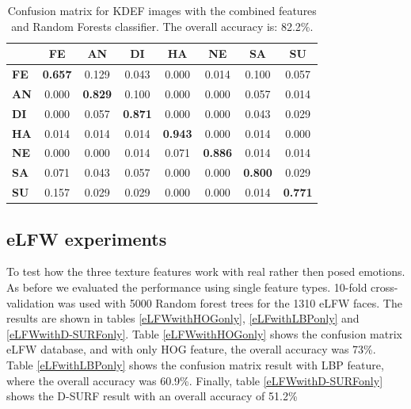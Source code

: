 \begin{table}[H]
	\fontsize{12}{12}
	\centering
	
	\caption{Confusion matrix for KDEF images with the combined features and Random Forests classifier. The overall accuracy is:  82.2\%. }
	\label{table:RF_KDEF_compined}
	\begin{tabular}{@{}|l|c|c|c|c|c|c|c|@{}}
		\hline
		& \textbf{FE}     & \textbf{AN}    & \textbf{DI}     & \textbf{HA} & \textbf{NE} & \textbf{SA}    & \textbf{SU}            \\ \hline
		\textbf{FE} & \textbf{0.657} & 0.129          & 0.043           & 0.000           & 0.014           & 0.100          & 0.057           \\ \hline
		\textbf{AN} & 0.000          & \textbf{0.829} & 0.100           & 0.000           & 0.000           & 0.057          & 0.014           \\ \hline
		\textbf{DI} & 0.000          & 0.057          & \textbf{0.871}  & 0.000           & 0.000           & 0.043          & 0.029           \\ \hline
		\textbf{HA} & 0.014          & 0.014          & 0.014           & \textbf{0.943}  & 0.000           & 0.014          & 0.000          \\ \hline
		\textbf{NE} & 0.000          & 0.000           & 0.014          & 0.071           & \textbf{0.886}  & 0.014           & 0.014              \\ \hline
		\textbf{SA} & 0.071          & 0.043          & 0.057           & 0.000           & 0.000           & \textbf{0.800}  & 0.029              \\ \hline
		\textbf{SU} & 0.157          & 0.029          & 0.029           & 0.000           & 0.000           & 0.014           & \textbf{0.771}   \\ \hline
	\end{tabular}
	
\end{table}












\subsection{eLFW experiments}
\label{sec:eLFWexperiments}

To test how the three texture features work with real rather then posed emotions. As before we evaluated the performance using single feature types. 10-fold cross-validation was used with 5000 Random forest trees for the 1310 eLFW faces. The results are shown in tables \ref{eLFWwithHOGonly}, \ref{eLFwithLBPonly} and \ref{eLFWwithD-SURFonly}. 
Table \ref{eLFWwithHOGonly} shows the confusion matrix eLFW database, and with only HOG feature, the overall accuracy was 73\%. Table \ref{eLFwithLBPonly} shows the confusion matrix result with LBP feature, where the overall accuracy was 60.9\%. Finally, table \ref{eLFWwithD-SURFonly} shows the D-SURF result with an overall accuracy of 51.2\% 


